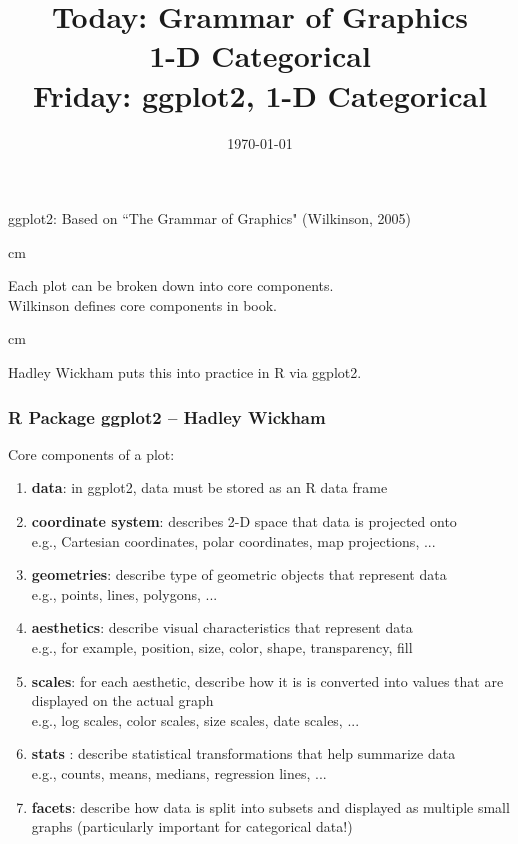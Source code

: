 \documentclass{beamer} %
\begin{document}
\title[dedup]{Today:  Grammar of Graphics \\ 1-D Categorical \\ Friday:  ggplot2, 1-D Categorical}

\date{\today}


\begin{frame}
	\maketitle
	
	ggplot2:  Based on ``The Grammar of Graphics" (Wilkinson, 2005)
	
	 cm
	
	Each plot can be broken down into core components.  \\Wilkinson defines core components in book.  
	
	 cm
	
	Hadley Wickham puts this into practice in R via ggplot2.
	
\end{frame}



\begin{frame}\frametitle{R Package ggplot2 -- Hadley Wickham}
	\small
	
	Core components of a plot: 
	
	\begin{enumerate}
		\item \textbf{data}: in ggplot2, data must be stored as an R data frame
		
		\item \textbf{coordinate system}: describes 2-D space that data is projected onto\\
		e.g., Cartesian coordinates, polar coordinates, map projections, ...
		\item \textbf{geometries}: describe type of geometric objects that represent data\\
		e.g., points, lines, polygons, ...
		\item \textbf{aesthetics}: describe visual characteristics that represent data\\
		e.g., for example, position, size, color, shape, transparency, fill
		\item \textbf{scales}: for each aesthetic, describe how it is is converted into values that are displayed on the actual graph\\
		e.g., log scales, color scales, size scales, date scales, ...
		\item \textbf{stats} : describe statistical transformations that help summarize data\\
		e.g., counts, means, medians, regression lines, ...
		\item \textbf{facets}: describe how data is split into subsets and displayed as multiple small graphs (particularly important for categorical data!)\\
	\end{enumerate}
	
	
\end{frame}
\end{document}
